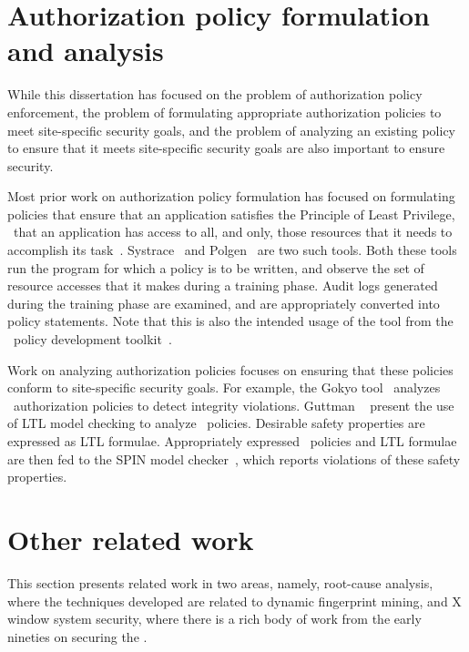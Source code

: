 \section{Authorization policy formulation and analysis}
\label{chapter:relatedwork:authpol}

While this dissertation has focused on the problem of authorization policy
enforcement, the problem of formulating appropriate authorization policies
to meet site-specific security goals, and the problem of analyzing an existing
policy to ensure that it meets site-specific security goals are also important
to ensure security.

Most prior work on authorization policy formulation has focused on formulating
policies that ensure that an application satisfies the Principle of Least
Privilege, \ie\ that an application has access to all, and only, those
resources that it needs to accomplish its task~\cite{ss75}. Systrace~\cite{p03}
and Polgen~\cite{hgh+05} are two such tools. Both these tools run the program
for which a policy is to be written, and observe the set of resource accesses
that it makes during a training phase. Audit logs generated during the training
phase are examined, and are appropriately converted into policy statements.
Note that this is also the intended usage of the  tool from
the \selinux\ policy development toolkit~\cite{tresys2}.

Work on analyzing authorization policies focuses on ensuring that these
policies conform to site-specific security goals. For example, the Gokyo
tool~\cite{jsz03} analyzes \selinux\ authorization policies to detect integrity
violations. Guttman \etal~\cite{ghr+05} present the use of LTL model checking
to analyze \selinux\ policies. Desirable safety properties are expressed as LTL
formulae. Appropriately expressed \selinux\ policies and LTL formulae are then
fed to the SPIN model checker~\cite{h03}, which reports violations of these
safety properties.

\section{Other related work}
\label{chapter:relatedwork:misc}

This section presents related work in two areas, namely, root-cause analysis,
where the techniques developed are related to dynamic fingerprint mining, and
X window system security, where there is a rich body of work from the early
nineties on securing the \xserver.

